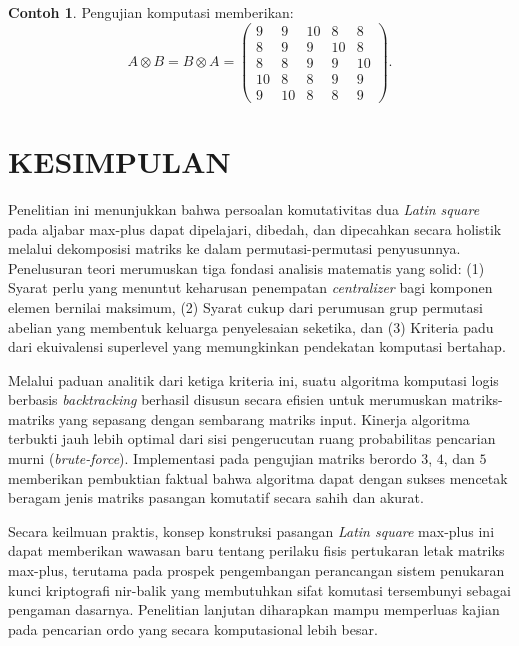 \documentclass[journal]{IEEEtran}
\theoremstyle{definition}
\newtheorem{con}{Contoh}[section]
\theoremstyle{plain}
\begin{document}
\begin{con}
    Pengujian komputasi memberikan:
    \begin{equation}
        A\otimes B=B\otimes A=
        \begin{pmatrix}
            9  & 9  & 10 & 8  & 8  \\
            8  & 9  & 9  & 10 & 8  \\
            8  & 8  & 9  & 9  & 10 \\
            10 & 8  & 8  & 9  & 9  \\
            9  & 10 & 8  & 8  & 9
        \end{pmatrix}.
    \end{equation}
\end{con}


\section{KESIMPULAN}
Penelitian ini menunjukkan bahwa persoalan komutativitas dua \textit{Latin square} pada aljabar max-plus dapat dipelajari, dibedah, dan dipecahkan secara holistik melalui dekomposisi matriks ke dalam permutasi-permutasi penyusunnya. Penelusuran teori merumuskan tiga fondasi analisis matematis yang solid: (1) Syarat perlu yang menuntut keharusan penempatan \textit{centralizer} bagi komponen elemen bernilai maksimum, (2) Syarat cukup dari perumusan grup permutasi abelian yang membentuk keluarga penyelesaian seketika, dan (3) Kriteria padu dari ekuivalensi superlevel yang memungkinkan pendekatan komputasi bertahap.

Melalui paduan analitik dari ketiga kriteria ini, suatu algoritma komputasi logis berbasis \textit{backtracking} berhasil disusun secara efisien untuk merumuskan matriks-matriks yang sepasang dengan sembarang matriks input. Kinerja algoritma terbukti jauh lebih optimal dari sisi pengerucutan ruang probabilitas pencarian murni (\textit{brute-force}). Implementasi pada pengujian matriks berordo $3$, $4$, dan $5$ memberikan pembuktian faktual bahwa algoritma dapat dengan sukses mencetak beragam jenis matriks pasangan komutatif secara sahih dan akurat.

Secara keilmuan praktis, konsep konstruksi pasangan \textit{Latin square} max-plus ini dapat memberikan wawasan baru tentang perilaku fisis pertukaran letak matriks max-plus, terutama pada prospek pengembangan perancangan sistem penukaran kunci kriptografi nir-balik yang membutuhkan sifat komutasi tersembunyi sebagai pengaman dasarnya. Penelitian lanjutan diharapkan mampu memperluas kajian pada pencarian ordo yang secara komputasional lebih besar.
\end{document}
